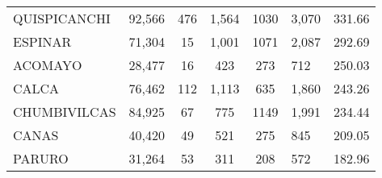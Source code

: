 \begin{tabular}{lrccclr}
	\cellcolor[HTML]{FFE699}QUISPICANCHI                           & 92,566                                                         & 476                                                         & 1,564                & 1030                     & 3,070                                                               & 331.66                                                                       \\
	\cellcolor[HTML]{FFE699}ESPINAR                                & 71,304                                                         & 15                                                          & 1,001                & 1071                     & 2,087                                                               & 292.69                                                                       \\
	\cellcolor[HTML]{FFE699}ACOMAYO                                & 28,477                                                         & 16                                                          & 423                  & 273                      & 712                                                                 & 250.03                                                                       \\
	\cellcolor[HTML]{FFE699}CALCA                                  & 76,462                                                         & 112                                                         & 1,113                & 635                      & 1,860                                                               & 243.26                                                                       \\
	\cellcolor[HTML]{FFE699}CHUMBIVILCAS                           & 84,925                                                         & 67                                                          & 775                  & 1149                     & 1,991                                                               & 234.44                                                                       \\
	\cellcolor[HTML]{C6E0B4}CANAS                                  & 40,420                                                         & 49                                                          & 521                  & 275                      & 845                                                                 & 209.05                                                                       \\
	\cellcolor[HTML]{C6E0B4}PARURO                                 & 31,264                                                         & 53                                                          & 311                  & 208                      & 572                                                                 & 182.96                                                                       \\

\end{tabular}

